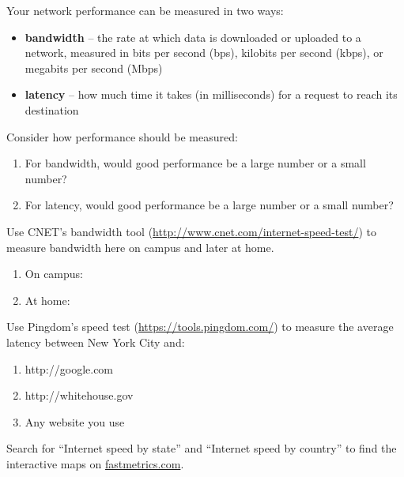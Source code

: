 
Your network performance can be measured in two ways:

\begin{itemize}[itemsep=0pt]
\item \textbf{bandwidth} -- the rate at which data is downloaded or uploaded to a network, measured in bits per second (bps), kilobits per second (kbps), or megabits per second (Mbps)
\item \textbf{latency} -- how much time it takes (in milliseconds) for a request to reach its destination
\end{itemize}




\Q Consider how performance should be measured:
\begin{enumerate}
\item For bandwidth, would good performance be a large number or a small number?
\item For latency, would good performance be a large number or a small number?
\end{enumerate}


\Q Use CNET's bandwidth tool (\url{http://www.cnet.com/internet-speed-test/}) to measure bandwidth here on campus and later at home.
\begin{enumerate}
\item On campus: 
\item At home: 
\end{enumerate}


\Q Use Pingdom's speed test (\url{https://tools.pingdom.com/}) to measure the average latency between New York City and:
\begin{enumerate}
\item http://google.com 
\item http://whitehouse.gov 
\item Any website you use 
\end{enumerate}


\Q Search for ``Internet speed by state'' and ``Internet speed by country'' to find the interactive maps on \href{https://www.fastmetrics.com/sitemap.php}{fastmetrics.com}.

